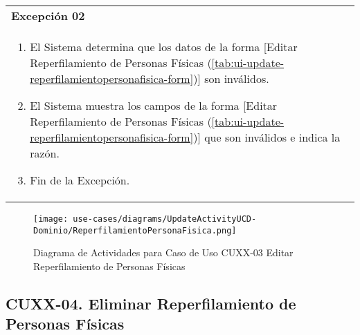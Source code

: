 	\begin{tabular}{ p{15.5cm} }
		\textbf{Excepci\'on 02} \\
		\begin{enumerate}
			\item El Sistema determina que los datos de la forma [Editar Reperfilamiento de Personas F\'isicas (\ref{tab:ui-update-reperfilamientopersonafisica-form})] son inv\'alidos.
			\item El Sistema muestra los campos de la forma [Editar Reperfilamiento de Personas F\'isicas (\ref{tab:ui-update-reperfilamientopersonafisica-form})] que son inv\'alidos e indica la raz\'on.
			\item Fin de la Excepci\'on.
		\end{enumerate}
	\end{tabular}
	
	\begin{figure}[H]
		\begin{center}
		 \label{tab:activity-update-ucd-entity-reperfilamientopersonafisica}
		 \texttt{[image: use-cases/diagrams/UpdateActivityUCD-Dominio/ReperfilamientoPersonaFisica.png]}
		 \caption{Diagrama de Actividades para Caso de Uso CUXX-03 Editar Reperfilamiento de Personas F\'isicas}
		\end{center}
	\end{figure}
	
	\clearpage
	\subsection{CUXX-04. Eliminar Reperfilamiento de Personas F\'isicas} \label{sec:cu-delete-ReperfilamientoPersonaFisica}
	
